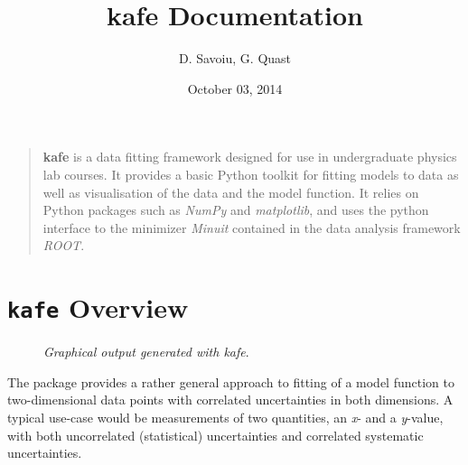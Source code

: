 \documentclass[a4paper,10pt,english]{sphinxmanual}
\title{kafe Documentation}
\date{October 03, 2014}
\author{D. Savoiu, G. Quast}
\begin{document}
\maketitle
\tableofcontents
{}\label{index::doc}

\begin{quote}

\textbf{kafe} is a data fitting framework designed for use in undergraduate
physics lab courses. It provides a basic Python toolkit for fitting
models to data as well as visualisation of the data and the model function.
It relies on Python packages such as \emph{NumPy} and \emph{matplotlib}, and uses
the python interface to the minimizer \emph{Minuit} contained in the data
analysis framework \emph{ROOT}.
\end{quote}


\chapter{\texttt{kafe} Overview}
\label{index:welcome-to-kafe-karlsruhe-fit-environment}\label{index:kafe-overview}\begin{figure}[htbp]\begin{flushright}
\capstart

\caption{\emph{Graphical output generated with kafe}.}\end{flushright}\end{figure}

The  package provides a rather general approach to fitting of a model
function to two-dimensional data points with correlated uncertainties in both
dimensions. A typical use-case would be measurements of two quantities,
an \emph{x}- and a \emph{y}-value, with both uncorrelated (statistical) uncertainties
and correlated systematic uncertainties.
\end{document}
